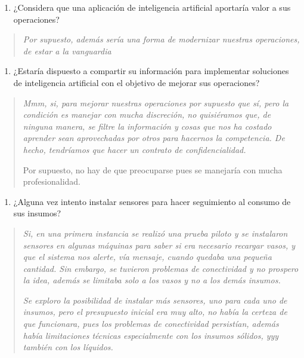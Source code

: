 \begin{enumerate}
\def\labelenumi{\arabic{enumi}.}
\setcounter{enumi}{2}
\item
  ¿Considera que una aplicación de inteligencia artificial aportaría valor a sus operaciones?
\end{enumerate}

\begin{quote}
\emph{Por supuesto, además sería una forma de modernizar nuestras operaciones, de estar a la vanguardia}
\end{quote}

\begin{enumerate}
\def\labelenumi{\arabic{enumi}.}
\setcounter{enumi}{3}
\item
  ¿Estaría dispuesto a compartir su información para implementar soluciones de inteligencia artificial con el objetivo de mejorar sus operaciones?
\end{enumerate}

\begin{quote}
\emph{Mmm, si, para mejorar nuestras operaciones por supuesto que sí, pero la condición es manejar con mucha discreción, no quisiéramos que, de ninguna manera, se filtre la información y cosas que nos ha costado aprender sean aprovechadas por otros para hacernos la competencia. De hecho, tendríamos que hacer un contrato de confidencialidad.}

Por supuesto, no hay de que preocuparse pues se manejaría con mucha profesionalidad.
\end{quote}

\begin{enumerate}
\def\labelenumi{\arabic{enumi}.}
\setcounter{enumi}{4}
\item
  ¿Alguna vez intento instalar sensores para hacer seguimiento al consumo de sus insumos?
\end{enumerate}

\begin{quote}
\emph{Si, en una primera instancia se realizó una prueba piloto y se instalaron sensores en algunas máquinas para saber si era necesario recargar vasos, y que el sistema nos alerte, vía mensaje, cuando quedaba una pequeña cantidad. Sin embargo, se tuvieron problemas de conectividad y no prospero la idea, además se limitaba solo a los vasos y no a los demás insumos.}

\emph{Se exploro la posibilidad de instalar más sensores, uno para cada uno de insumos, pero el presupuesto inicial era muy alto, no había la certeza de que funcionara, pues los problemas de conectividad persistían, además había limitaciones técnicas especialmente con los insumos sólidos, yyy también con los líquidos.}
\end{quote}

